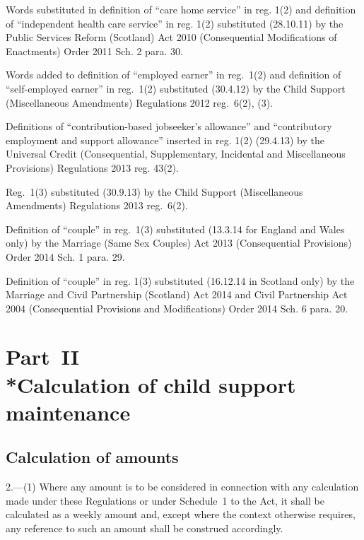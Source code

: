 \documentclass[12pt,a4paper]{article}
\begin{document}
{Words substituted in definition of ``care home service'' in reg. 1(2) and definition of ``independent health care service'' in reg. 1(2) substituted (28.10.11) by the Public Services Reform (Scotland) Act 2010 (Consequential Modifications of Enactments) Order 2011 Sch. 2 para. 30.

Words added to definition of ``employed earner'' in reg.~1(2) and definition of ``self-employed earner'' in reg.~1(2) substituted (30.4.12) by the Child Support (Miscellaneous Amendments) Regulations 2012 reg.~6(2), (3).

Definitions of ``contribution-based jobseeker's allowance'' and ``contributory employment and support allowance'' inserted in reg. 1(2) (29.4.13) by the Universal Credit (Consequential, Supplementary, Incidental and Miscellaneous Provisions) Regulations 2013 reg. 43(2).

Reg.~1(3) substituted (30.9.13) by the Child Support (Miscellaneous Amendments) Regulations 2013 reg.~6(2).

Definition of ``couple'' in reg.~1(3) substituted (13.3.14 for England and Wales only) by the Marriage (Same Sex Couples) Act 2013 (Consequential Provisions) Order 2014 Sch. 1 para. 29.

Definition of ``couple'' in reg. 1(3) substituted (16.12.14 in Scotland only) by the Marriage and Civil Partnership (Scotland) Act 2014 and Civil Partnership Act 2004 (Consequential Provisions and Modifications) Order 2014 Sch. 6 para. 20.
}


\section[Part~II --- Calculation of child support maintenance]{Part~II\\*Calculation of child support maintenance}

\renewcommand\parthead{--- Part~II}

\subsection[2. Calculation of amounts]{Calculation of amounts}

2.---(1)  Where any amount is to be considered in connection with any calculation made under these Regulations or under Schedule~1 to the Act, it shall be calculated as a weekly amount and, except where the context otherwise requires, any reference to such an amount shall be construed accordingly.
\end{document}
